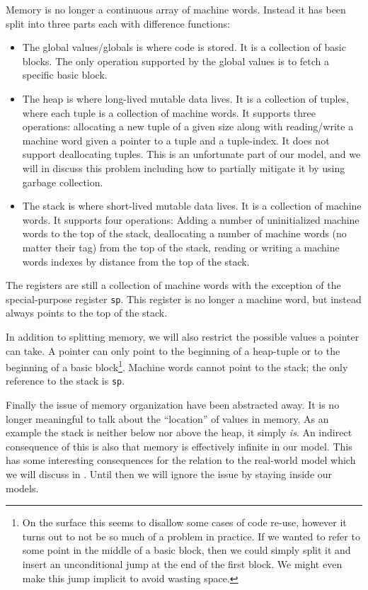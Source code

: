 Memory is no longer a continuous array of machine words. Instead it has been
split into three parts each with difference functions:

\begin{itemize}
\item The global values/globals is where code is stored. It is a collection of
  basic blocks. The only operation supported by the global values is to fetch a
  specific basic block.
\item The heap is where long-lived mutable data lives. It is a collection of
  tuples, where each tuple is a collection of machine words. It supports three
  operations: allocating a new tuple of a given size along with reading/write a
  machine word given a pointer to a tuple and a tuple-index. It does not support
  deallocating tuples. This is an unfortunate part of our model, and we will in
   discuss this problem including how to partially mitigate
  it by using garbage collection.
\item The stack is where short-lived mutable data lives. It is a collection of
  machine words. It supports four operations: Adding a number of uninitialized
  machine words to the top of the stack, deallocating a number of machine words
  (no matter their tag) from the top of the stack, reading or writing a machine
  words indexes by distance from the top of the stack.
\end{itemize}

The registers are still a collection of machine words with the exception of the
special-purpose register \texttt{sp}. This register is no longer a machine word,
but instead always points to the top of the stack.

In addition to splitting memory, we will also restrict the possible values a
pointer can take. A pointer can only point to the beginning of a heap-tuple or
to the beginning of a basic block\footnote{On the surface this seems to disallow
  some cases of code re-use, however it turns out to not be so much of a problem
  in practice. If we wanted to refer to some point in the middle of a basic
  block, then we could simply split it and insert an unconditional jump at the
  end of the first block. We might even make this jump implicit to avoid wasting
  space.}. Machine words cannot point to the stack; the only reference to the
stack is \texttt{sp}.

Finally the issue of memory organization have been abstracted away. It is no
longer meaningful to talk about the ``location'' of values in memory. As an
example the stack is neither below nor above the heap, it simply \emph{is}.  An
indirect consequence of this is also that memory is effectively infinite in our
model. This has some interesting consequences for the relation to the real-world
model which we will discuss in . Until then we will ignore
the issue by staying inside our models.

